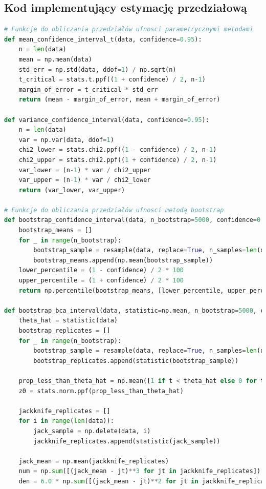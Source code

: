 \documentclass[12pt,a4paper]{article}
\begin{document}
\subsection{Kod implementujący estymację przedziałową}
\begin{lstlisting}[language=Python, caption=Funkcje do obliczania przedziałów ufnosci]
# Funkcje do obliczania przedziałów ufnosci parametrycznymi metodami
def mean_confidence_interval_t(data, confidence=0.95):
    n = len(data)
    mean = np.mean(data)
    std_err = np.std(data, ddof=1) / np.sqrt(n)
    t_critical = stats.t.ppf((1 + confidence) / 2, n-1)
    margin_of_error = t_critical * std_err
    return (mean - margin_of_error, mean + margin_of_error)

def variance_confidence_interval(data, confidence=0.95):
    n = len(data)
    var = np.var(data, ddof=1)
    chi2_lower = stats.chi2.ppf((1 - confidence) / 2, n-1)
    chi2_upper = stats.chi2.ppf((1 + confidence) / 2, n-1)
    var_lower = (n-1) * var / chi2_upper
    var_upper = (n-1) * var / chi2_lower
    return (var_lower, var_upper)

# Funkcje do obliczania przedziałów ufnosci metodą bootstrap
def bootstrap_confidence_interval(data, n_bootstrap=5000, confidence=0.95):
    bootstrap_means = []
    for _ in range(n_bootstrap):
        bootstrap_sample = resample(data, replace=True, n_samples=len(data))
        bootstrap_means.append(np.mean(bootstrap_sample))
    lower_percentile = (1 - confidence) / 2 * 100
    upper_percentile = (1 + confidence) / 2 * 100
    return np.percentile(bootstrap_means, [lower_percentile, upper_percentile])

def bootstrap_bca_interval(data, statistic=np.mean, n_bootstrap=5000, confidence=0.95):
    theta_hat = statistic(data)
    bootstrap_replicates = []
    for _ in range(n_bootstrap):
        bootstrap_sample = resample(data, replace=True, n_samples=len(data))
        bootstrap_replicates.append(statistic(bootstrap_sample))
    
    prop_less_than_theta_hat = np.mean([1 if t < theta_hat else 0 for t in bootstrap_replicates])
    z0 = stats.norm.ppf(prop_less_than_theta_hat)
    
    jackknife_replicates = []
    for i in range(len(data)):
        jack_sample = np.delete(data, i)
        jackknife_replicates.append(statistic(jack_sample))
    
    jack_mean = np.mean(jackknife_replicates)
    num = np.sum([(jack_mean - jt)**3 for jt in jackknife_replicates])
    den = 6.0 * np.sum([(jack_mean - jt)**2 for jt in jackknife_replicates])**1.5
    

\end{lstlisting}
\end{document}
